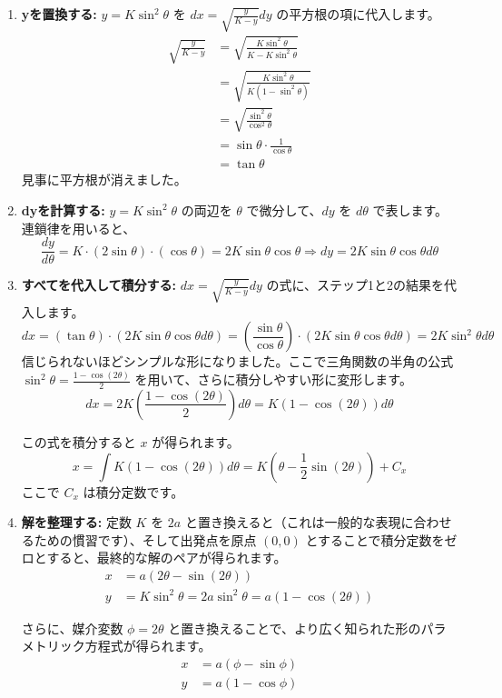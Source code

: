 \documentclass[12pt,a4paper]{ltjsarticle}
\begin{document}
\begin{enumerate}
\item \textbf{yを置換する:} $y = K \sin^2\theta$ を $dx = \sqrt{\frac{y}{K-y}} dy$ の平方根の項に代入します。
\begin{align*}
\sqrt{\frac{y}{K-y}}
  &= \sqrt{\frac{K \sin^2\theta}{K - K \sin^2\theta}} \\
  &= \sqrt{\frac{K \sin^2\theta}{K(1 - \sin^2\theta)}} \\
  &= \sqrt{\frac{\sin^2\theta}{\cos^2\theta}} \\
  &= \sin\theta \cdot \frac{1}{\cos\theta} \\
  &= \tan\theta
\end{align*}
見事に平方根が消えました。

\item \textbf{dyを計算する:} $y = K \sin^2\theta$ の両辺を $\theta$ で微分して、$dy$ を $d\theta$ で表します。連鎖律を用いると、
\begin{equation}
\frac{dy}{d\theta} = K \cdot (2 \sin\theta) \cdot (\cos\theta) = 2K \sin\theta \cos\theta \Rightarrow dy = 2K \sin\theta \cos\theta d\theta
\end{equation}

\item \textbf{すべてを代入して積分する:} $dx = \sqrt{\frac{y}{K-y}} dy$ の式に、ステップ1と2の結果を代入します。
\begin{equation}
dx = (\tan\theta) \cdot (2K \sin\theta \cos\theta d\theta) = \left(\frac{\sin\theta}{\cos\theta}\right) \cdot (2K \sin\theta \cos\theta d\theta) = 2K \sin^2\theta d\theta
\end{equation}
信じられないほどシンプルな形になりました。ここで三角関数の半角の公式 $\sin^2\theta = \frac{1 - \cos(2\theta)}{2}$ を用いて、さらに積分しやすい形に変形します。
\begin{equation}
dx = 2K\left(\frac{1 - \cos(2\theta)}{2}\right)d\theta = K(1 - \cos(2\theta))d\theta
\end{equation}

この式を積分すると $x$ が得られます。
\begin{equation}
x = \int K(1 - \cos(2\theta))d\theta = K\left(\theta - \frac{1}{2}\sin(2\theta)\right) + C_x
\end{equation}
ここで $C_x$ は積分定数です。

\item \textbf{解を整理する:} 定数 $K$ を $2a$ と置き換えると（これは一般的な表現に合わせるための慣習です）、そして出発点を原点 $(0,0)$ とすることで積分定数をゼロとすると、最終的な解のペアが得られます。
\begin{align}
x &= a(2\theta - \sin(2\theta)) \\
y &= K\sin^2\theta = 2a\sin^2\theta = a(1 - \cos(2\theta))
\end{align}

さらに、媒介変数 $\phi = 2\theta$ と置き換えることで、より広く知られた形のパラメトリック方程式が得られます。
\begin{align}
x &= a(\phi - \sin\phi) \\
y &= a(1 - \cos\phi)
\end{align}
\end{enumerate}
\end{document}
